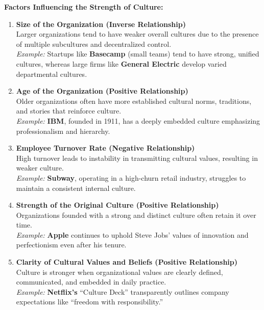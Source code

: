 \documentclass[10pt,a4paper]{book}
\begin{document}
\vspace{1cm}


\textbf{Factors Influencing the Strength of Culture:}

\begin{enumerate}
    \item \textbf{Size of the Organization (Inverse Relationship)} \\
    Larger organizations tend to have weaker overall cultures due to the presence of multiple subcultures and decentralized control.\\
    \textit{Example:} Startups like \textbf{Basecamp} (small teams) tend to have strong, unified cultures, whereas large firms like \textbf{General Electric} develop varied departmental cultures.

    \item \textbf{Age of the Organization (Positive Relationship)} \\
    Older organizations often have more established cultural norms, traditions, and stories that reinforce culture.\\
    \textit{Example:} \textbf{IBM}, founded in 1911, has a deeply embedded culture emphasizing professionalism and hierarchy.

    \item \textbf{Employee Turnover Rate (Negative Relationship)} \\
    High turnover leads to instability in transmitting cultural values, resulting in weaker culture.\\
    \textit{Example:} \textbf{Subway}, operating in a high-churn retail industry, struggles to maintain a consistent internal culture.

    \item \textbf{Strength of the Original Culture (Positive Relationship)} \\
    Organizations founded with a strong and distinct culture often retain it over time.\\
    \textit{Example:} \textbf{Apple} continues to uphold Steve Jobs’ values of innovation and perfectionism even after his tenure.

    \item \textbf{Clarity of Cultural Values and Beliefs (Positive Relationship)} \\
    Culture is stronger when organizational values are clearly defined, communicated, and embedded in daily practice.\\
    \textit{Example:} \textbf{Netflix’s} “Culture Deck” transparently outlines company expectations like “freedom with responsibility.”


\end{enumerate}
\end{document}
